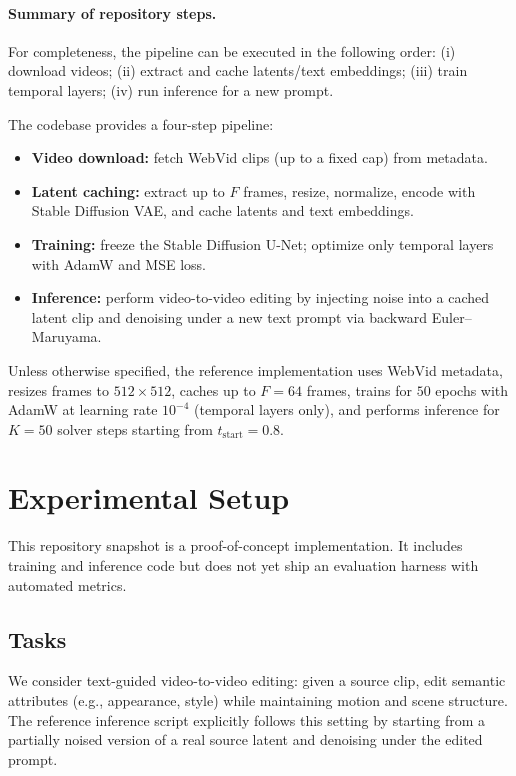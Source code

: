 \documentclass[journal]{IEEEtran}
\begin{document}
\paragraph{Summary of repository steps.}
For completeness, the pipeline can be executed in the following order: (i) download videos; (ii) extract and cache latents/text embeddings; (iii) train temporal layers; (iv) run inference for a new prompt.

\vspace{0.5em}
The codebase provides a four-step pipeline:
\begin{itemize}
\item \textbf{Video download:} fetch WebVid clips (up to a fixed cap) from metadata.
\item \textbf{Latent caching:} extract up to $F$ frames, resize, normalize, encode with Stable Diffusion VAE, and cache latents and text embeddings.
\item \textbf{Training:} freeze the Stable Diffusion U-Net; optimize only temporal layers with AdamW and MSE loss.
\item \textbf{Inference:} perform video-to-video editing by injecting noise into a cached latent clip and denoising under a new text prompt via backward Euler--Maruyama.
\end{itemize}

Unless otherwise specified, the reference implementation uses WebVid metadata, resizes frames to $512\times512$, caches up to $F=64$ frames, trains for $50$ epochs with AdamW at learning rate $10^{-4}$ (temporal layers only), and performs inference for $K=50$ solver steps starting from $t_\mathrm{start}=0.8$.

\section{Experimental Setup}
This repository snapshot is a proof-of-concept implementation. It includes training and inference code but does not yet ship an evaluation harness with automated metrics.

\subsection{Tasks}
We consider text-guided video-to-video editing: given a source clip, edit semantic attributes (e.g., appearance, style) while maintaining motion and scene structure. The reference inference script explicitly follows this setting by starting from a partially noised version of a real source latent and denoising under the edited prompt.
\end{document}
